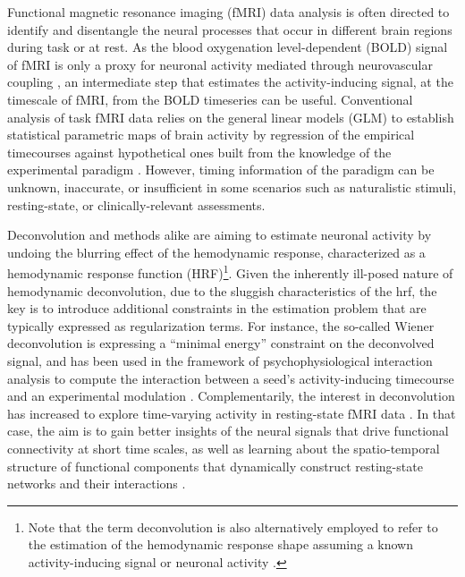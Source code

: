 Functional magnetic resonance imaging (fMRI) data analysis is often directed to
identify and disentangle the neural processes that occur in different brain
regions during task or at rest. As the blood oxygenation level-dependent (BOLD)
signal of fMRI \citep{Ogawa1990Brainmagneticresonance} is only a proxy for
neuronal activity mediated through neurovascular coupling
\citep{Logothetis2001Neurophysiologicalinvestigationbasis}, an intermediate step
that estimates the activity-inducing signal, at the timescale of fMRI, from the
BOLD timeseries can be useful. Conventional analysis of task fMRI data relies on
the general linear models (GLM) to establish statistical parametric maps of
brain activity by regression of the empirical timecourses against hypothetical
ones built from the knowledge of the experimental paradigm
\citep{Boynton1996LinearSystemsAnalysis,Cohen1997ParametricAnalysisfMRI,Friston1998EventRelatedfMRI,Friston2008DEMvariationaltreatment}.
However, timing information of the paradigm can be unknown, inaccurate, or
insufficient in some scenarios such as naturalistic stimuli, resting-state, or
clinically-relevant assessments.

Deconvolution and methods alike are aiming to estimate neuronal activity by
undoing the blurring effect of the hemodynamic response, characterized as a
hemodynamic response function (HRF)\footnote{Note that the term deconvolution is
also alternatively employed to refer to the estimation of the hemodynamic
response shape assuming a known activity-inducing signal or neuronal activity
\citep{Goutte2000Modelinghaemodynamicresponse,Marrelec2002Bayesianestimationhemodynamic,
Ciuciu2003Unsupervisedrobustnonparametric,Casanova2008impacttemporalregularization}.
}. Given the inherently ill-posed nature of hemodynamic deconvolution, due to
the sluggish characteristics of the \acrshort*{hrf}, the key is to introduce
additional constraints in the estimation problem that are typically expressed as
regularization terms. For instance, the so-called Wiener deconvolution is
expressing a \enquote{minimal energy} constraint on the deconvolved signal, and
has been used in the framework of psychophysiological interaction analysis to
compute the interaction between a seed's activity-inducing timecourse and an
experimental modulation
\citep{Glover1999DeconvolutionImpulseResponse,Gitelman2003Modelingregionalpsychophysiologic,
Gerchen2014Analyzingtaskdependent,Di2018TaskConnectomicsExamining,
Freitas2020Timeresolvedeffective}. Complementarily, the interest in
deconvolution has increased to explore time-varying activity in resting-state
fMRI data
\citep{Preti2017dynamicfunctionalconnectome,Keilholz2017TimeResolvedResting,
Lurie2020Questionscontroversiesstudy,Bolton2020TappingMultiFaceted}. In that
case, the aim is to gain better insights of the neural signals that drive
functional connectivity at short time scales, as well as learning about the
spatio-temporal structure of functional components that dynamically construct
resting-state networks and their interactions
\citep{Karahanoglu2017Dynamicslargescale}.

